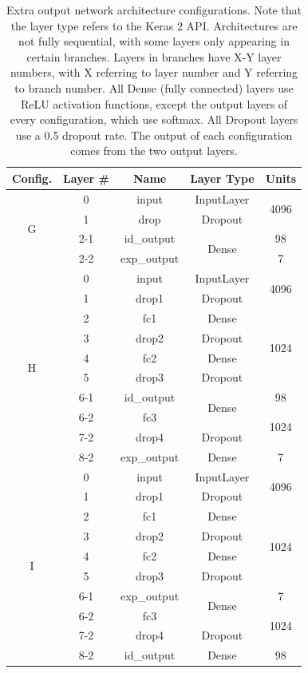 \begin{table}[h!]
\begin{center}
\begin{tabular}{|c|c|c|c|c|}
\hline
\textbf{Config.} & \textbf{Layer \#} & \textbf{Name} & \textbf{Layer Type} & \textbf{Units} \\ \hline
\multirow{4}{*}{G} & 0 & input & InputLayer & \multirow{2}{*}{4096} \\ \cline{2-4}
& 1 & drop & Dropout & \\ \cline{2-5}
& 2-1 & id\_output & \multirow{2}{*}{Dense} & 98 \\ \cline{2-3} \cline{5-5}
& 2-2 & exp\_output & & 7 \\ \hline
\multirow{10}{*}{H} & 0 & input & InputLayer & \multirow{2}{*}{4096} \\ \cline{2-4}
& 1 & drop1 & Dropout & \\ \cline{2-5}
& 2 & fc1 & Dense & \multirow{4}{*}{1024} \\ \cline{2-4}
& 3 & drop2 & Dropout & \\ \cline{2-4}
& 4 & fc2 & Dense & \\ \cline{2-4}
& 5 & drop3 & Dropout & \\ \cline{2-5}
& 6-1 & id\_output & \multirow{2}{*}{Dense} & 98 \\ \cline{2-3} \cline{5-5}
& 6-2 & fc3 & & \multirow{2}{*}{1024} \\ \cline{2-4}
& 7-2 & drop4 & Dropout & \\ \cline{2-5}
& 8-2 & exp\_output & Dense & 7 \\ \hline
\multirow{10}{*}{I} & 0 & input & InputLayer & \multirow{2}{*}{4096} \\ \cline{2-4}
& 1 & drop1 & Dropout & \\ \cline{2-5}
& 2 & fc1 & Dense & \multirow{4}{*}{1024} \\ \cline{2-4}
& 3 & drop2 & Dropout & \\ \cline{2-4}
& 4 & fc2 & Dense & \\ \cline{2-4}
& 5 & drop3 & Dropout & \\ \cline{2-5}
& 6-1 & exp\_output & \multirow{2}{*}{Dense} & 7 \\ \cline{2-3} \cline{5-5}
& 6-2 & fc3 & & \multirow{2}{*}{1024} \\ \cline{2-4}
& 7-2 & drop4 & Dropout & \\ \cline{2-5}
& 8-2 & id\_output & Dense & 98 \\ \hline
\end{tabular}
\end{center}
\caption[Extra output architecture configurations]{Extra output network architecture configurations. Note that the layer type refers to the Keras 2 API. Architectures are not fully sequential, with some layers only appearing in certain branches. Layers in branches have X-Y layer numbers, with X referring to layer number and Y referring to branch number. All Dense (fully connected) layers use ReLU activation functions, except the output layers of every configuration, which use softmax. All Dropout layers use a 0.5 dropout rate. The output of each configuration comes from the two output layers.}
\label{tab:ex-out-arch}
\end{table}


\cleardoublepage